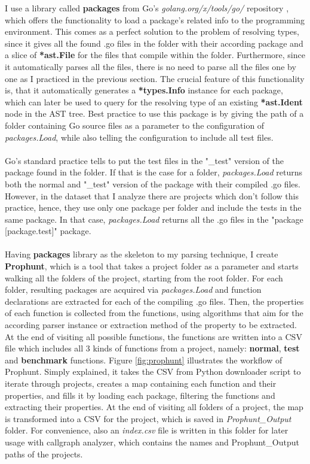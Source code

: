\documentclass{seal_thesis}
\begin{document}
I use a library called \textbf{packages} from Go's \textit{golang.org/x/tools/go/} repository  \cite{packages}, which offers the functionality to load a package's related info to the programming environment. This comes as a perfect solution to the problem of resolving types, since it gives all the found .go files in the folder with their according package and a slice of \textbf{*ast.File} for the files that compile within the folder. Furthermore, since it automatically parses all the files, there is no need to parse all the files one by one as I practiced in the previous section. The crucial feature of this functionality is, that it automatically generates a \textbf{*types.Info} instance for each package, which can later be used to query for the resolving type of an existing \textbf{*ast.Ident} node in the AST tree. Best practice to use this package is by giving the path of a folder containing Go source files as a parameter to the configuration of \textit{packages.Load}, while also telling the configuration to include all test files.\\
\\
Go's standard practice tells to put the test files in the "\_test" version of the package found in the folder. If that is the case for a folder, \textit{packages.Load} returns both the normal and "\_test" version of the package with their compiled .go files. However, in the dataset that I analyze there are projects which don't follow this practice, hence, they use only one package per folder and include the tests in the same package. In that case, \textit{packages.Load} returns all the .go files in the "package [package.test]" package.\\
\\
Having \textbf{packages} library as the skeleton to my parsing technique, I create \textbf{Prophunt}, which is a tool that takes a project folder as a parameter and starts walking all the folders of the project, starting from the root folder. For each folder, resulting packages are acquired via \textit{packages.Load} and function declarations are extracted for each of the compiling .go files. Then, the properties of each function is collected from the functions, using algorithms that aim for the according parser instance or extraction method of the property to be extracted. At the end of visiting all possible functions, the functions are written into a CSV file which includes all 3 kinds of functions from a project, namely: \textbf{normal}, \textbf{test} and \textbf{benchmark} functions. Figure \ref{fig:prophunt} illustrates the workflow of Prophunt. Simply explained, it takes the CSV from Python downloader script to iterate through projects, creates a map containing each function and their properties, and fills it by loading each package, filtering the functions and extracting their properties. At the end of visiting all folders of a project, the map is transformed into a CSV for the project, which is saved in \textit{Prophunt\_Output} folder. For convenience, also an \textit{index.csv} file is written in this folder for later usage with callgraph analyzer, which contains the names and Prophunt\_Output paths of the projects.
\end{document}
